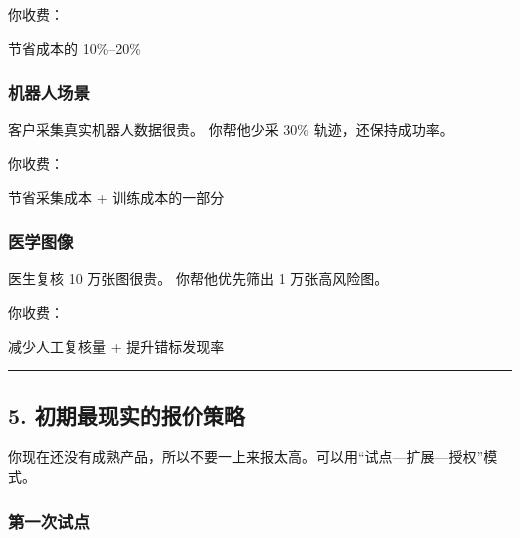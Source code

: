 \documentclass[
  12pt,
]{ctexart}
\newenvironment{Shaded}{}{}
\newcommand{\NormalTok}[1]{#1}
\begin{document}
你收费：

\begin{Shaded}
\begin{Highlighting}[]
\NormalTok{节省成本的 10\%–20\%}
\end{Highlighting}
\end{Shaded}

\subsubsection{机器人场景}\label{ux673aux5668ux4ebaux573aux666f}

客户采集真实机器人数据很贵。 你帮他少采 30\% 轨迹，还保持成功率。

你收费：

\begin{Shaded}
\begin{Highlighting}[]
\NormalTok{节省采集成本 + 训练成本的一部分}
\end{Highlighting}
\end{Shaded}

\subsubsection{医学图像}\label{ux533bux5b66ux56feux50cf}

医生复核 10 万张图很贵。 你帮他优先筛出 1 万张高风险图。

你收费：

\begin{Shaded}
\begin{Highlighting}[]
\NormalTok{减少人工复核量 + 提升错标发现率}
\end{Highlighting}
\end{Shaded}

\begin{center}\rule{0.5\linewidth}{0.5pt}\end{center}

\subsection{5.
初期最现实的报价策略}\label{ux521dux671fux6700ux73b0ux5b9eux7684ux62a5ux4ef7ux7b56ux7565}

你现在还没有成熟产品，所以不要一上来报太高。可以用``试点---扩展---授权''模式。

\subsubsection{第一次试点}\label{ux7b2cux4e00ux6b21ux8bd5ux70b9}
\end{document}
